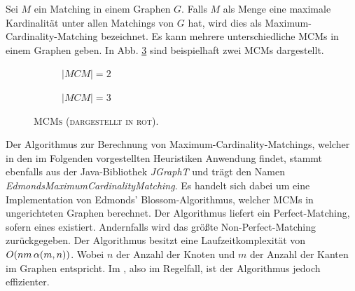 Sei $M$ ein Matching in einem Graphen $G$. Falls $M$ als Menge eine maximale Kardinalität unter
allen Matchings von $G$ hat, wird dies als Maximum-Cardinality-Matching bezeichnet. \cite{WikiMatching}
Es kann mehrere unterschiedliche MCMs in einem Graphen geben.
In Abb. \ref{fig:mcm_examples} sind beispielhaft zwei MCMs dargestellt.
\begin{figure}[H]
  \begin{subfigure}[b]{0.4\textwidth}
  \centering
  \caption{\textsc{$|MCM| = 2$}}
  \label{fig:mcm1}
  \end{subfigure}
  \hfill
  \begin{subfigure}[b]{0.4\textwidth}
  \centering
    \caption{\textsc{$|MCM| = 3$}}
    \label{fig:mcm_2}
  \end{subfigure}
  \caption{\textsc{MCMs (dargestellt in rot).}}
  \label{fig:mcm_examples}
\end{figure}

Der Algorithmus zur Berechnung von Maximum-Cardinality-Matchings, welcher in den im Folgenden
vorgestellten Heuristiken Anwendung findet, stammt ebenfalls aus der Java-Bibliothek \textit{JGraphT} \cite{JGraphT} und trägt
den Namen \textit{EdmondsMaximumCardinalityMatching}. Es handelt sich dabei um eine Implementation von Edmonds' Blossom-Algorithmus,
welcher MCMs in ungerichteten Graphen berechnet. Der Algorithmus liefert ein Perfect-Matching, sofern eines existiert.
Andernfalls wird das größte Non-Perfect-Matching zurückgegeben.
Der Algorithmus besitzt eine Laufzeitkomplexität von $O(nm \thinspace \alpha(m, n))$. Wobei $n$ der Anzahl der Knoten
und $m$ der Anzahl der Kanten im Graphen entspricht. Im , also im Regelfall, ist der Algorithmus jedoch effizienter.

